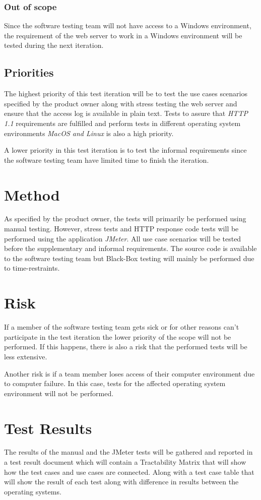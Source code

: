 \documentclass[a4paper, 12pt]{article}
\begin{document}
\subsubsection{Out of scope}
Since the software testing team will not have access to a Windows environment, the requirement of the web server to work in a Windows environment will be tested during the next iteration.

\subsection{Priorities}
The highest priority of this test iteration will be to test the use cases scenarios specified by the product owner along with stress testing the web server and ensure that the access log is available in plain text. Tests to assure that  \textit{HTTP 1.1} requirements are fulfilled and perform tests in different operating system environments \textit{MacOS and Linux} is also a high priority.

A lower priority in this test iteration is to test the informal requirements since the software testing team have limited time to finish the iteration.

\section{Method}
As specified by the product owner, the tests will primarily be performed using manual testing. However, stress tests and HTTP response code tests will be performed using the application \textit{JMeter}. All use case scenarios will be tested before the supplementary and informal requirements. The source code is available to the software testing team but Black-Box testing will mainly be performed due to time-restraints.

\section{Risk}
If a member of the software testing team gets sick or for other reasons can't participate in the test iteration the lower priority of the scope will not be performed. If this happens, there is also a risk that the performed tests will be less extensive. 

Another risk is if a team member loses access of their computer environment due to computer failure. In this case, tests for the affected operating system environment will not be performed.

\section{Test Results}
The results of the manual and the JMeter tests will be gathered and reported in a test result document which will contain a Tractability Matrix that will show how the test cases and use cases are connected. Along with a test case table that will show the result of each test along with difference in results between the operating systems.
\end{document}
